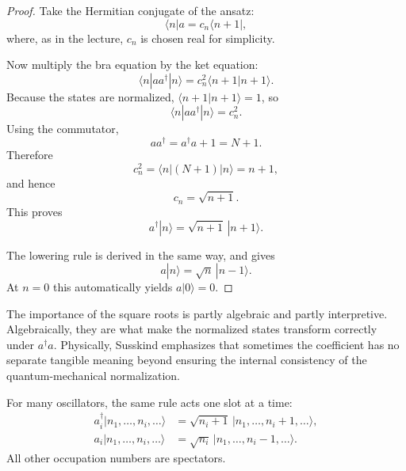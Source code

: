 \begin{proof}
Take the Hermitian conjugate of the ansatz:
\begin{equation}
\langle n|a = c_n \langle n+1|,
\end{equation}
where, as in the lecture, \(c_n\) is chosen real for simplicity.

Now multiply the bra equation by the ket equation:
\begin{equation}
\langle n|aa^\dagger|n\rangle = c_n^2 \langle n+1|n+1\rangle.
\end{equation}
Because the states are normalized, \(\langle n+1|n+1\rangle=1\), so
\begin{equation}
\langle n|aa^\dagger|n\rangle = c_n^2.
\end{equation}
Using the commutator,
\begin{equation}
aa^\dagger = a^\dagger a + 1 = N+1.
\end{equation}
Therefore
\begin{equation}
c_n^2 = \langle n|(N+1)|n\rangle = n+1,
\end{equation}
and hence
\begin{equation}
c_n = \sqrt{n+1}.
\end{equation}
This proves
\begin{equation}
a^\dagger|n\rangle = \sqrt{n+1}\,|n+1\rangle.
\end{equation}

The lowering rule is derived in the same way, and gives
\begin{equation}
a|n\rangle = \sqrt{n}\,|n-1\rangle.
\end{equation}
At \(n=0\) this automatically yields \(a|0\rangle=0\).
\end{proof}

The importance of the square roots is partly algebraic and partly interpretive. Algebraically, they are what make the normalized states transform correctly under \(a^\dagger a\). Physically, Susskind emphasizes that sometimes the coefficient has no separate tangible meaning beyond ensuring the internal consistency of the quantum-mechanical normalization.

For many oscillators, the same rule acts one slot at a time:
\begin{align}
a_i^\dagger |n_1,\ldots,n_i,\ldots\rangle
&=
\sqrt{n_i+1}\,|n_1,\ldots,n_i+1,\ldots\rangle, \\
a_i |n_1,\ldots,n_i,\ldots\rangle
&=
\sqrt{n_i}\,|n_1,\ldots,n_i-1,\ldots\rangle.
\end{align}
All other occupation numbers are spectators.

